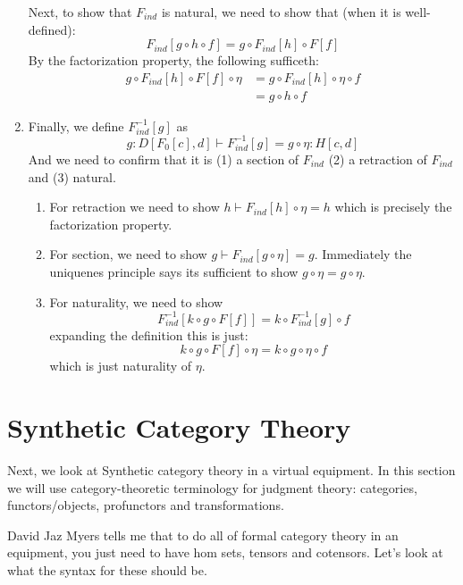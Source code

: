 \documentclass{article}
\begin{document}
\begin{construction}
\begin{enumerate}
    Next, to show that $F_{ind}$ is natural, we need to show that
    (when it is well-defined):
    \[F_{ind}[g \circ h \circ f] = g \circ F_{ind}[h] \circ F[f] \]
    By the factorization property, the following sufficeth:
    \begin{align*}
     g \circ F_{ind}[h] \circ F[f] \circ \eta
     &= g \circ F_{ind}[h] \circ \eta \circ f \tag{naturality of $\eta$}\\
     &= g \circ h \circ f \tag{factorization}
    \end{align*}
  \item Finally, we define $F_{ind}^{-1}[g]$ as
    \[ g : D[F_0[c],d] \vdash F_{ind}^{-1}[g] = g \circ \eta : H[c,d] \]
    And we need to confirm that it is (1) a section of $F_{ind}$ (2) a
    retraction of $F_{ind}$ and (3) natural.
    \begin{enumerate}
    \item For retraction we need to show $h \vdash F_{ind}[h] \circ
      \eta = h$ which is precisely the factorization property.
    \item For section, we need to show $g \vdash F_{ind}[g \circ \eta]
      = g$. Immediately the uniquenes principle says its sufficient to
      show $g \circ \eta = g \circ \eta$.
    \item For naturality, we need to show
      \[ F_{ind}^{-1}[k \circ g \circ F[f]] = k \circ F_{ind}^{-1}[g] \circ f \]
      expanding the definition this is just:
      \[ k \circ g \circ F[f] \circ \eta = k \circ g \circ \eta \circ f \]
      which is just naturality of $\eta$.
    \end{enumerate}
  \end{enumerate}
\end{construction}

\section{Synthetic Category Theory}

Next, we look at Synthetic category theory in a virtual equipment. In
this section we will use category-theoretic terminology for judgment
theory: categories, functors/objects, profunctors and transformations.

David Jaz Myers tells me that to do all of formal category theory in
an equipment, you just need to have hom sets, tensors and cotensors.
%
Let's look at what the syntax for these should be.
\end{document}
